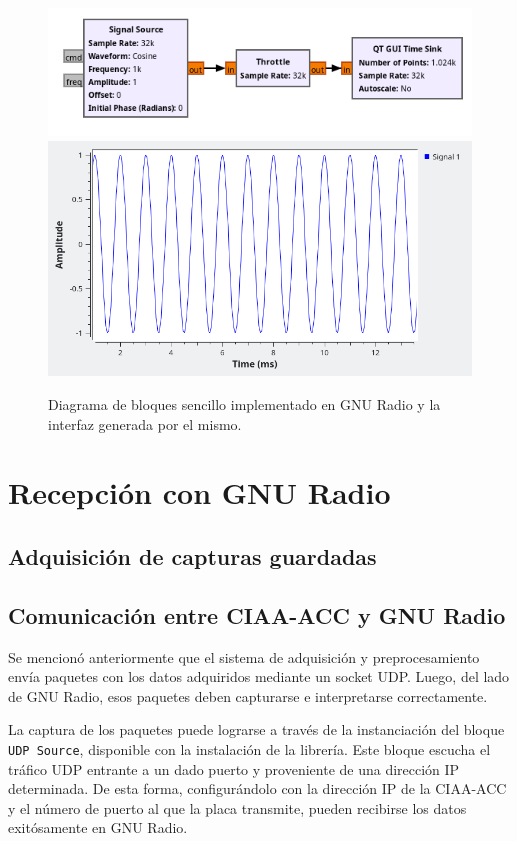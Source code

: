 \documentclass[../../main.tex]{subfiles}
\begin{document}
\begin{figure}[H]
    \centering
    {\includegraphics[width=0.5\linewidth]{gnu-dummy-bd.png}}\\[1PC]
    {\includegraphics[width=0.5\linewidth]{gnu-dummy-plot.png}}
    \caption{Diagrama de bloques sencillo implementado en GNU Radio y la interfaz generada por el mismo.}
    \label{fig::gnu-dummy}
\end{figure}

\section{Recepción con GNU Radio}
\subsection{Adquisición de capturas guardadas}
\subsection{Comunicación entre CIAA-ACC y GNU Radio}
Se mencionó anteriormente que el sistema de adquisición y preprocesamiento envía paquetes con los datos adquiridos mediante un socket UDP. Luego, del lado de GNU Radio, esos paquetes deben capturarse e interpretarse correctamente. 

La captura de los paquetes puede lograrse a través de la instanciación del bloque \texttt{UDP Source}, disponible con la instalación de la librería. Este bloque escucha el tráfico UDP entrante a un dado puerto y proveniente de una dirección IP  determinada. De esta forma, configurándolo con la dirección IP de la CIAA-ACC y el número de puerto al que la placa transmite, pueden recibirse los datos exitósamente en GNU Radio. 
\end{document}
